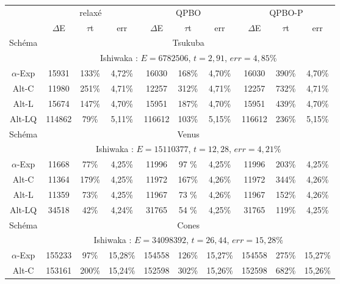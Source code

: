 \documentclass[../main/These_Mathias_Paget.tex]{subfiles}
\begin{document}
\begin{table}
\begin{tabular}{c|ccc|ccc|ccc}
 &  \multicolumn{3}{c|}{relaxé}   & \multicolumn{3}{c}{QPBO} & \multicolumn{3}{|c}{QPBO-P} \\
 & $\Delta$E & $\tau$t & err   & $\Delta$E & $\tau$t & err & $\Delta$E & $\tau$t & err \\
\hline
\multirow{2}{*}{Schéma} & \multicolumn{9}{c}{Tsukuba} \\
 & \multicolumn{9}{c}{Ishiwaka : $E=\num{6782506}$, $t=2,91$, $err=4,85\%$} \\
\hline
$\alpha$-Exp & \num{15931}   &  133\% &  4,72\% & \num{16030 } &  168\% & 4,70\%  & \num{16030 } & 390\% & 4,70\%  \\
Alt-C & \num{11980}   &  251\% &  4,71\% & \num{12257 } &  312\% & 4,71\%  & \num{12257 } & 732\% & 4,71\%  \\
Alt-L & \num{15674}   &  147\% &  4,70\% & \num{15951 } &  187\% & 4,70\%  & \num{15951 } & 439\% & 4,70\%  \\
Alt-LQ & \num{114862}  &   79\% &  5,11\% & \num{116612} &  103\% & 5,15\%  & \num{116612} & 236\% & 5,15\%  \\
\hline
\multirow{2}{*}{Schéma} & \multicolumn{9}{c}{Venus} \\
 & \multicolumn{9}{c}{Ishiwaka : $E=\num{15110377}$, $t=12,28$, $err=4,21\%$} \\
\hline
$\alpha$-Exp & \num{11668}   &  77\%  &  4,25\% & \num{11996}  & 97 \% & 4,25\%   & \num{11996}  & 203\% & 4,25\%  \\
Alt-C & \num{11364}   & 179\%  &  4,25\% & \num{11972}  & 167\% & 4,26\%   & \num{11972}  & 344\% & 4,26\%  \\
Alt-L & \num{11359}   &  73\%  &  4,25\% & \num{11967}  & 73 \% & 4,26\%   & \num{11967}  & 152\% & 4,26\%  \\
Alt-LQ & \num{34518}   &  42\%  &  4,24\% & \num{31765}  & 54 \% & 4,25\%   & \num{31765}  & 119\% & 4,25\%  \\     
\hline
\multirow{2}{*}{Schéma} & \multicolumn{9}{c}{Cones} \\
 & \multicolumn{9}{c}{Ishiwaka : $E=\num{34098392}$, $t=26,44$, $err=15,28\%$} \\
\hline
$\alpha$-Exp & \num{155233}  &  97\%  & 15,28\% & \num{154558} &  126\% & 15,27\% & \num{154558} & 275\% & 15,27\% \\
Alt-C & \num{153161}  & 200\%  & 15,24\% & \num{152598} &  302\% & 15,26\% & \num{152598} & 682\% & 15,26\% \\

\end{tabular}
\end{table}
\end{document}
